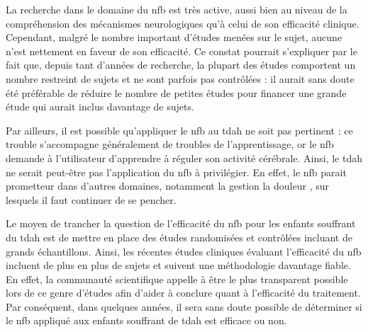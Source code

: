 La recherche dans le domaine du \gls{nfb} est très active, aussi bien au niveau de la compréhension des mécanismes neurologiques 
qu'à celui de son efficacité clinique.
Cependant, malgré le nombre important d'études menées sur le sujet, aucune n'est nettement en faveur de son efficacité. 
Ce constat pourrait s'expliquer par le fait que, depuis tant d'années de recherche, la plupart des études comportent un nombre
restreint de sujets et ne sont parfois pas contrôlées : il aurait sans doute été préférable de réduire le nombre de petites études pour financer une grande étude
qui aurait inclus davantage de sujets.

Par ailleurs, il est possible qu'appliquer le \gls{nfb} au \gls{tdah} ne soit pas pertinent : ce trouble s'accompagne généralement de troubles de l'apprentissage,
or le \gls{nfb} demande à l'utilisateur d'apprendre à réguler son activité cérébrale. Ainsi, le \gls{tdah} ne serait peut-être pas l'application du 
\gls{nfb} à privilégier. En effet, le \gls{nfb}
parait prometteur dans d'autres domaines, notamment la gestion la douleur \citep{Barthelemy2019}, sur lesquels il faut continuer de se pencher.

Le moyen de trancher la question de l'efficacité du \gls{nfb} pour les enfants souffrant du \gls{tdah} est de mettre en place des études randomisées 
et contrôlées incluant de grands échantillons. 
Ainsi, les récentes études cliniques évaluant l'efficacité du \gls{nfb} incluent de plus en plus de sujets et suivent une méthodologie davantage fiable. 
En effet, la communauté scientifique appelle à être le plus transparent possible lors de ce genre d'études afin d'aider à conclure quant à 
l'efficacité du traitement. Par conséquent, dans quelques années, il sera sans doute possible de déterminer si le \gls{nfb} appliqué aux enfants
souffrant de \gls{tdah} est efficace ou non.


%

